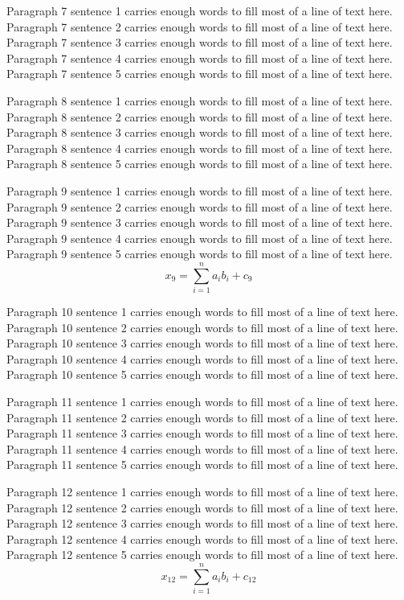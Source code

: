 Paragraph 7 sentence 1 carries enough words to fill most of a line of text here.
Paragraph 7 sentence 2 carries enough words to fill most of a line of text here.
Paragraph 7 sentence 3 carries enough words to fill most of a line of text here.
Paragraph 7 sentence 4 carries enough words to fill most of a line of text here.
Paragraph 7 sentence 5 carries enough words to fill most of a line of text here.

Paragraph 8 sentence 1 carries enough words to fill most of a line of text here.
Paragraph 8 sentence 2 carries enough words to fill most of a line of text here.
Paragraph 8 sentence 3 carries enough words to fill most of a line of text here.
Paragraph 8 sentence 4 carries enough words to fill most of a line of text here.
Paragraph 8 sentence 5 carries enough words to fill most of a line of text here.

Paragraph 9 sentence 1 carries enough words to fill most of a line of text here.
Paragraph 9 sentence 2 carries enough words to fill most of a line of text here.
Paragraph 9 sentence 3 carries enough words to fill most of a line of text here.
Paragraph 9 sentence 4 carries enough words to fill most of a line of text here.
Paragraph 9 sentence 5 carries enough words to fill most of a line of text here.
\begin{equation}
  x_9 = \sum_{i=1}^{n} a_i b_i + c_9
\end{equation}

Paragraph 10 sentence 1 carries enough words to fill most of a line of text here.
Paragraph 10 sentence 2 carries enough words to fill most of a line of text here.
Paragraph 10 sentence 3 carries enough words to fill most of a line of text here.
Paragraph 10 sentence 4 carries enough words to fill most of a line of text here.
Paragraph 10 sentence 5 carries enough words to fill most of a line of text here.

Paragraph 11 sentence 1 carries enough words to fill most of a line of text here.
Paragraph 11 sentence 2 carries enough words to fill most of a line of text here.
Paragraph 11 sentence 3 carries enough words to fill most of a line of text here.
Paragraph 11 sentence 4 carries enough words to fill most of a line of text here.
Paragraph 11 sentence 5 carries enough words to fill most of a line of text here.

Paragraph 12 sentence 1 carries enough words to fill most of a line of text here.
Paragraph 12 sentence 2 carries enough words to fill most of a line of text here.
Paragraph 12 sentence 3 carries enough words to fill most of a line of text here.
Paragraph 12 sentence 4 carries enough words to fill most of a line of text here.
Paragraph 12 sentence 5 carries enough words to fill most of a line of text here.
\begin{equation}
  x_12 = \sum_{i=1}^{n} a_i b_i + c_12
\end{equation}
